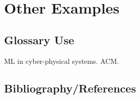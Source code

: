 



\section{Other Examples}

\subsection{Glossary Use}

\Gls{ML} in \glspl{cyber-physical system}.
\gls{ACM}.

\subsection{Bibliography/References}

